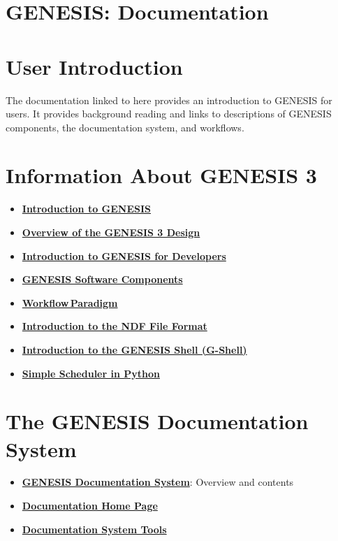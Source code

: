 \documentclass[12pt]{article}
\begin{document}
\section*{GENESIS: Documentation}


\section*{User Introduction}

The documentation linked to here provides an introduction to GENESIS for
users.  It provides background reading and links to descriptions of GENESIS
components, the documentation system, and workflows.

\section*{Information About GENESIS 3}

\begin{itemize}
   \item[]\href{../genesis-intro/genesis-intro.tex}{\bf Introduction to GENESIS}
   \item[]\href{../genesis-overview/genesis-overview.tex}{\bf Overview of the GENESIS 3 Design}
   \item[]\href{../developer-intro/developer-intro.tex}{\bf Introduction to GENESIS for Developers}
   \item[]\href{../genesis-components/genesis-components.tex}{\bf GENESIS Software Components}
   \item[]\href{../workflow-intro/workflow-intro.tex}{\bf Workflow\,Paradigm}
   \item[]\href{../ndf-file-format/ndf-file-format.tex}{\bf Introduction to the NDF File Format}
   \item[]\href{../gshell/gshell.tex}{\bf Introduction to the GENESIS Shell (G-Shell)}
   \item[]\href{../sspy/sspy.tex}{\bf Simple Scheduler in Python}
\end{itemize}

\section*{The GENESIS Documentation System}

\begin{itemize}
   \item[]\href{../documentation-overview/documentation-overview.tex}{\bf GENESIS
                Documentation System}: Overview and contents
   \item[]\href{../documentation-homepage/documentation-homepage.tex}{\bf Documentation Home Page}
   \item[]\href{../document-tools/document-tools.tex}{\bf Documentation System Tools}
\end{itemize}
\end{document}
